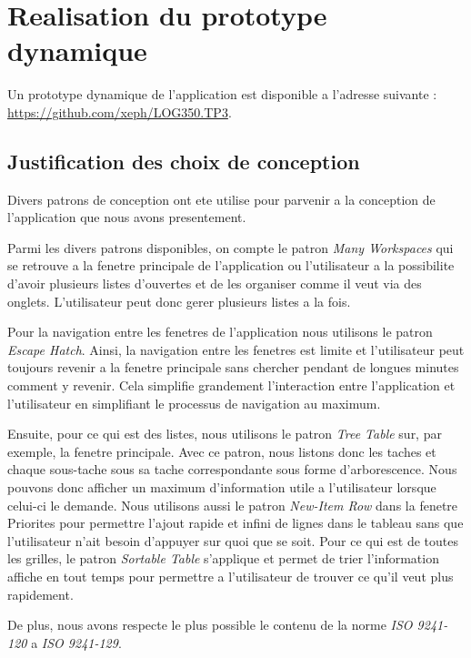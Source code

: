 \documentclass[letterpaper, oneside, 12pt, these, creativecommons]{thETS}
\begin{document}
\chapter{Realisation du prototype dynamique}

Un prototype dynamique de l'application est disponible a l'adresse suivante : \\
\url{https://github.com/xeph/LOG350.TP3}.

\section{Justification des choix de conception}

Divers patrons de conception ont ete utilise pour parvenir a la conception de l'application que nous avons presentement. 

Parmi les divers patrons disponibles, on compte le patron \emph{Many Workspaces} qui se retrouve a la fenetre principale de l'application ou l'utilisateur a la possibilite d'avoir plusieurs listes d'ouvertes et de les organiser comme il veut via des onglets. L'utilisateur peut donc gerer plusieurs listes a la fois. 

Pour la navigation entre les fenetres de l'application nous utilisons le patron \emph{Escape Hatch}. Ainsi, la navigation entre les fenetres est limite et l'utilisateur peut toujours revenir a la fenetre principale sans chercher pendant de longues minutes comment y revenir. Cela simplifie grandement l'interaction entre l'application et l'utilisateur en simplifiant le processus de navigation au maximum. 

Ensuite, pour ce qui est des listes, nous utilisons le patron \emph{Tree Table} sur, par exemple, la fenetre principale. Avec ce patron, nous listons donc les taches et chaque sous-tache sous sa tache correspondante sous forme d'arborescence. Nous pouvons donc afficher un maximum d'information utile a l'utilisateur lorsque celui-ci le demande. Nous utilisons aussi le patron \emph{New-Item Row} dans la fenetre Priorites pour permettre l'ajout rapide et infini de lignes dans le tableau sans que l'utilisateur n'ait besoin d'appuyer sur quoi que se soit. Pour ce qui est de toutes les grilles, le patron \emph{Sortable Table} s'applique et permet de trier l'information affiche en tout temps pour permettre a l'utilisateur de trouver ce qu'il veut plus rapidement. 

De plus, nous avons respecte le plus possible le contenu de la norme \emph{ISO 9241-120} a \emph{ISO 9241-129}.
\end{document}
